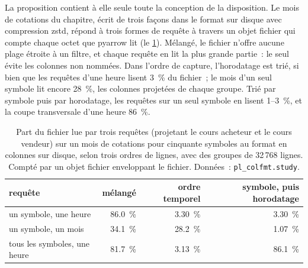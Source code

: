 La proposition contient à elle seule toute la conception de la disposition. Le mois de cotations du chapitre, écrit de trois façons dans le format sur disque avec
compression zstd, répond à trois formes de requête à travers un objet fichier qui compte chaque octet que pyarrow lit
(le \cref{tab:pl:columnar-formats:queries}). Mélangé, le fichier n'offre aucune plage étroite à un filtre, et chaque requête en lit la plus grande partie~:
le  seul évite les colonnes non nommées. Dans l'ordre de capture, l'horodatage est trié, si bien que les requêtes d'une heure lisent
3~\% du fichier~; le mois d'un seul symbole lit encore 28~\%, les colonnes projetées de chaque groupe. Trié par symbole puis par horodatage,
les requêtes sur un seul symbole en lisent 1--3~\%, et la coupe transversale d'une heure 86~\%.

\begin{table}[ht]
\centering\small
\begin{tabular}{lrrr}
\toprule
requête & mélangé & ordre temporel & symbole, puis horodatage \\
\midrule
un symbole, une heure & 86.0~\% & 3.30~\% & 3.30~\% \\
un symbole, un mois & 34.1~\% & 28.2~\% & 1.07~\% \\
tous les symboles, une heure & 81.7~\% & 3.13~\% & 86.1~\% \\
\bottomrule
\end{tabular}
\caption{Part du fichier lue par trois requêtes (projetant le cours acheteur et le cours vendeur) sur un mois de cotations pour cinquante symboles au
format en colonnes sur disque, selon trois ordres de lignes, avec des groupes de 32\,768 lignes. Compté par un objet fichier enveloppant le fichier. Données~:
\texttt{pl\_colfmt.study}.}\label{tab:pl:columnar-formats:queries}
\end{table}

